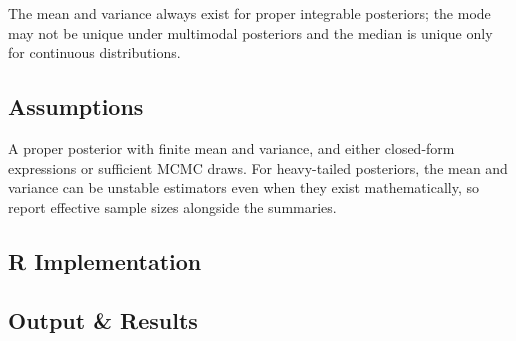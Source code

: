 \documentclass[
]{article}
\newenvironment{Shaded}{\begin{snugshade}}{\end{snugshade}}
\newcommand{\AttributeTok}[1]{\textcolor[rgb]{0.13,0.29,0.53}{#1}}
\newcommand{\CommentTok}[1]{\textcolor[rgb]{0.56,0.35,0.01}{\textit{#1}}}
\newcommand{\DecValTok}[1]{\textcolor[rgb]{0.00,0.00,0.81}{#1}}
\newcommand{\FloatTok}[1]{\textcolor[rgb]{0.00,0.00,0.81}{#1}}
\newcommand{\FunctionTok}[1]{\textcolor[rgb]{0.13,0.29,0.53}{\textbf{#1}}}
\newcommand{\NormalTok}[1]{#1}
\newcommand{\OtherTok}[1]{\textcolor[rgb]{0.56,0.35,0.01}{#1}}
\newcommand{\SpecialCharTok}[1]{\textcolor[rgb]{0.81,0.36,0.00}{\textbf{#1}}}
\begin{document}
The mean and variance always exist for proper integrable posteriors; the
mode may not be unique under multimodal posteriors and the median is
unique only for continuous distributions.

\subsection{Assumptions}\label{assumptions}

A proper posterior with finite mean and variance, and either closed-form
expressions or sufficient MCMC draws. For heavy-tailed posteriors, the
mean and variance can be unstable estimators even when they exist
mathematically, so report effective sample sizes alongside the
summaries.

\subsection{R Implementation}\label{r-implementation}

\begin{Shaded}
\end{Shaded}

\subsection{Output \& Results}\label{output-results}
\end{document}
